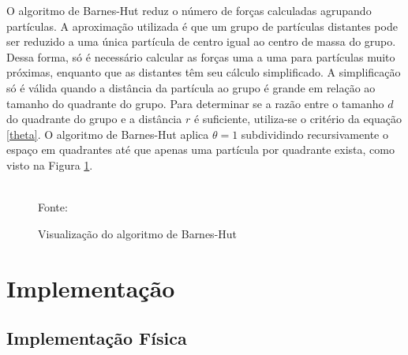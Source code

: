 \documentclass[rel_mlp]{iiufrgs}
\newcommand{\fonte}[1]{\\Fonte: {#1}}
\begin{document}
O algoritmo de Barnes-Hut reduz o número de forças calculadas agrupando partículas. A aproximação utilizada é que um grupo de partículas distantes pode ser reduzido a uma única partícula de centro igual ao centro de massa do grupo. Dessa forma, só é necessário calcular as forças uma a uma para partículas muito próximas, enquanto que as distantes têm seu cálculo simplificado. A simplificação só é válida quando a distância da partícula ao grupo é grande em relação ao tamanho do quadrante do grupo. Para determinar se a razão entre o tamanho $d$ do quadrante do grupo e a distância $r$ é suficiente, utiliza-se o critério da equação \eqref{theta}. O algoritmo de Barnes-Hut aplica $\theta=1$ subdividindo recursivamente o espaço em quadrantes até que apenas uma partícula por quadrante exista, como visto na Figura \ref{fig:barneshut.eps}.



\begin{figure}[htb]
    \centering
    \caption{Visualização do algoritmo de Barnes-Hut}
    \fonte{\cite{barnesHutImg}}
    \label{fig:barneshut.eps}
\end{figure}


\chapter{Implementação}

\section{Implementação Física}
\end{document}
